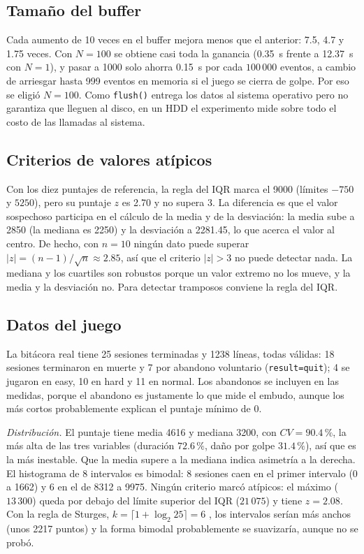 \documentclass[conference]{IEEEtran}
\begin{document}
\subsection{Tamaño del buffer}
Cada aumento de 10 veces en el buffer mejora menos que el anterior: 7.5, 4.7 y 1.75 veces. Con $N=100$ se obtiene casi toda la ganancia (0.35~s frente a 12.37~s con $N=1$), y pasar a 1000 solo ahorra 0.15~s por cada $100\,000$ eventos, a cambio de arriesgar hasta 999 eventos en memoria si el juego se cierra de golpe. Por eso se eligió $N=100$. Como \texttt{flush()} entrega los datos al sistema operativo pero no garantiza que lleguen al disco, en un HDD el experimento mide sobre todo el costo de las llamadas al sistema.

\subsection{Criterios de valores atípicos}
Con los diez puntajes de referencia, la regla del IQR marca el 9000 (límites $-750$ y $5250$), pero su puntaje $z$ es 2.70 y no supera 3. La diferencia es que el valor sospechoso participa en el cálculo de la media y de la desviación: la media sube a 2850 (la mediana es 2250) y la desviación a 2281.45, lo que acerca el valor al centro. De hecho, con $n=10$ ningún dato puede superar $|z|=(n-1)/\sqrt{n}\approx 2.85$, así que el criterio $|z|>3$ no puede detectar nada. La mediana y los cuartiles son robustos porque un valor extremo no los mueve, y la media y la desviación no. Para detectar tramposos conviene la regla del IQR.

\subsection{Datos del juego}
La bitácora real tiene 25 sesiones terminadas y 1238 líneas, todas válidas: 18 sesiones terminaron en muerte y 7 por abandono voluntario (\texttt{result=quit}); 4 se jugaron en easy, 10 en hard y 11 en normal. Los abandonos se incluyen en las medidas, porque el abandono es justamente lo que mide el embudo, aunque los más cortos probablemente explican el puntaje mínimo de 0.

\emph{Distribución.} El puntaje tiene media 4616 y mediana 3200, con $CV=90.4\,\%$, la más alta de las tres variables (duración $72.6\,\%$, daño por golpe $31.4\,\%$), así que es la más inestable. Que la media supere a la mediana indica asimetría a la derecha. El histograma de 8 intervalos es bimodal: 8 sesiones caen en el primer intervalo (0 a 1662) y 6 en el de 8312 a 9975. Ningún criterio marcó atípicos: el máximo ($13\,300$) queda por debajo del límite superior del IQR ($21\,075$) y tiene $z=2.08$. Con la regla de Sturges, $k=\lceil 1+\log_2 25\rceil=6$ \cite{sturges}, los intervalos serían más anchos (unos 2217 puntos) y la forma bimodal probablemente se suavizaría, aunque no se probó.
\end{document}
